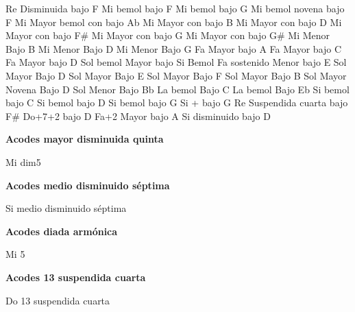 \vskip 20pt
\upchord{\DdimFPiano}Re Disminuida bajo F \hfill
{} \hfill\null\break
\vskip 20pt
\upchord{\EflatFPiano}Mi bemol bajo F \hfill
\upchord{\EflatGPiano}Mi bemol bajo G \hfill
\upchord{\EflatnineCPiano}Mi bemol novena bajo F \hfill\null\break
\vskip 20pt
\upchord{\EAflatPiano}\qquad Mi Mayor bemol con bajo Ab \hfill
\upchord{\EBPiano}\qquad Mi Mayor con bajo B \hfill\null\break %
\vskip 20pt
\upchord{\EDPiano}Mi Mayor con bajo D \hfill
\upchord{\EFsPiano}\qquad Mi Mayor con bajo F\# \hfill
\upchord{\EGPiano}\qquad Mi Mayor con bajo G \hfill\null\break
\vskip 20pt
\upchord{\EGsPiano}\qquad Mi Mayor con bajo G\# \hfill
\upchord{\EmBPiano}\qquad Mi Menor Bajo B \hfill\null\break %
\vskip 20pt
\upchord{\EmDPiano}\qquad Mi Menor Bajo D \hfill
\upchord{\EmGPiano}\qquad Mi Menor Bajo G \hfill\null\break
\vskip 20pt
\upchord{\FAPiano}Fa Mayor bajo A \hfill %
\upchord{\FCPiano}Fa Mayor bajo C \hfill\null\break
\vskip 20pt
\upchord{\FDPiano}Fa Mayor bajo D \hfill %
\upchord{\GflatBflatPiano}Sol bemol Mayor bajo Si Bemol \hfill\null\break %
\vskip 20pt
\upchord{\FsmEPiano}Fa sostenido Menor bajo E \hfill
\upchord{\GDPiano}Sol Mayor Bajo D \hfill\null\break %
\vskip 20pt
\upchord{\GEPiano}Sol Mayor Bajo E \hfill %
\upchord{\GFPiano}Sol Mayor Bajo F \hfill\null\break
\vskip 20pt
\upchord{\GBPiano}\qquad\qquad Sol  Mayor Bajo B \hfill
\upchord{\GnineDPiano}Sol Mayor Novena Bajo D \hfill\null\break
\vskip 20pt
\upchord{\GmBflatPiano}Sol Menor Bajo Bb \hfill
\upchord{\AflatCPiano}La bemol Bajo C \hfill\null\break
\vskip 20pt
\upchord{\AflatEflatPiano}La bemol Bajo Eb \hfill %
\upchord{\BflatCPiano}Si bemol bajo C \hfill\null\break
\vskip 20pt
\upchord{\BflatDPiano}Si bemol bajo D \hfill
\upchord{\BflatGPiano}Si bemol bajo G \hfill\null\break
\vskip 20pt
\upchord{\BmajsevenGPiano}Si + bajo G \hfill
\upchord{\DsusFsPiano}Re Suspendida cuarta bajo F\# \hfill\null\break
\vskip 20pt
\upchord{\CMajtwoDPiano}\qquad Do+7+2 bajo D \hfill
\upchord{\FtwoAPiano}Fa+2 Mayor bajo A \hfill\null\break
\vskip 20pt
\upchord{\BdimDPiano}Si disminuido bajo D \hfill\null\break
\vskip 20pt
\normalsize

\textbf{Acodes mayor disminuida quinta}
\vskip 25pt

\small
\upchord{\EdimfivePiano}Mi dim5
\normalsize

\vskip 20pt
\textbf{Acodes medio disminuido s\'eptima}
\vskip 25pt

\small
\upchord{\BmsevenbfivePiano}Si medio disminuido s\'eptima
\normalsize

\vskip 20pt
\textbf{Acodes diada arm\'onica}
\vskip 25pt

\small
\upchord{\EfivePiano}Mi 5
\normalsize

\vskip 20pt
\textbf{Acodes 13 suspendida cuarta}
\vskip 25pt

\small
\upchord{\CsusthirteenPiano}Do 13 suspendida cuarta
\normalsize

\clearpage
\fi
%
